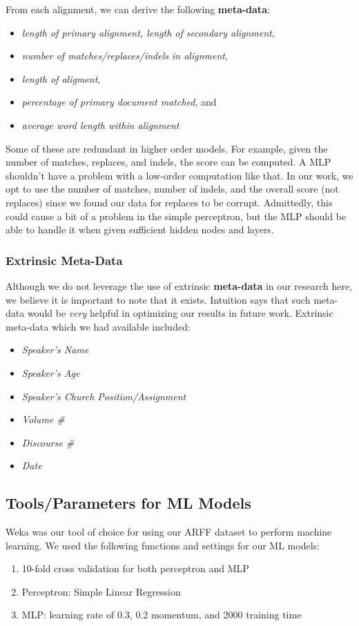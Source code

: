 From each alignment, we can derive the following \textbf{meta-data}:
	\begin{itemize}
		\item \textit{length of primary alignment, length of secondary alignment},
		\item \textit{number of matches/replaces/indels in alignment},
		\item \textit{length of aligment},
		\item \textit{percentage of primary document matched}, and
		\item \textit{average word length within alignment}
	\end{itemize}

Some of these are redundant in higher order models. For example, given the number of matches, replaces, and indels, the score can be computed. A MLP shouldn't have a problem with a low-order computation like that. In our work, we opt to use the number of matches, number of indels, and the overall score (not replaces) since we found our data for replaces to be corrupt. Admittedly, this could cause a bit of a problem in the simple perceptron, but the MLP should be able to handle it when given sufficient hidden nodes and layers.

\subsubsection{Extrinsic Meta-Data}
Although we do not leverage the use of extrinsic \textbf{meta-data} in our research here, we believe it is important to note that it exists. Intuition says that such meta-data would be \textit{very} helpful in optimizing our results in future work. Extrinsic meta-data which we had available included:
	\begin{itemize}
		\item \textit{Speaker's Name}
		\item \textit{Speaker's Age}
		\item \textit{Speaker's Church Position/Assignment}
		\item \textit{Volume \#}
		\item \textit{Discourse \#}
		\item \textit{Date}
	\end{itemize}

\subsection{Tools/Parameters for ML Models}
Weka \cite{weka_2009} was our tool of choice for using our ARFF dataset to perform machine learning. We used the following functions and settings for our ML models:
\begin{enumerate}
	\item 10-fold cross validation for both perceptron and MLP
	\item Perceptron: Simple Linear Regression
	\item MLP: learning rate of 0.3, 0.2 momentum, and 2000 training time
\end{enumerate}

